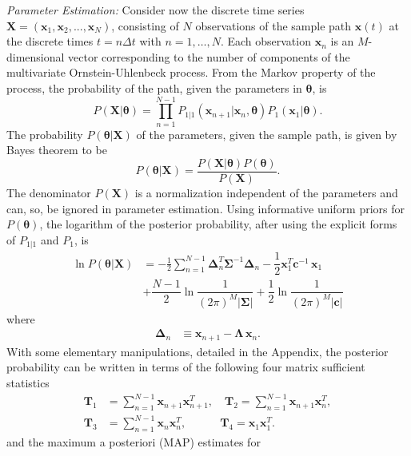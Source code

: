 \documentclass[english,aps, twocolumn, pre,superscriptaddress, notitlepage]{revtex4-1}
\begin{document}
\emph{Parameter Estimation: }Consider now the discrete time series
$\boldsymbol{X}=\left(\boldsymbol{x}_{1},\boldsymbol{x}_{2},...,\boldsymbol{x}_{N}\right)$,
consisting of $N$ observations of the sample path $\boldsymbol{x}(t)$
at the discrete times $t=n\Delta t$ with $n=1,\ldots,N.$ Each observation
$\boldsymbol{x}_{n}$ is an $M$-dimensional vector corresponding
to the number of components of the multivariate Ornstein-Uhlenbeck
process. From the Markov property of the process, the probability
of the path, given the parameters in $\boldsymbol{\theta}$, is
\begin{equation}
P\left(\boldsymbol{X}\vert\boldsymbol{\theta}\right)=\prod_{n=1}^{N-1}P_{1\vert1}\left(\boldsymbol{x}_{n+1}\vert\boldsymbol{x}_{n},\boldsymbol{\theta}\right)P_{1}\left(\boldsymbol{x}_{1}\vert\boldsymbol{\theta}\right).
\end{equation}
The probability $P\left(\boldsymbol{\theta}\vert\boldsymbol{X}\right)$
of the parameters, given the sample path, is given by Bayes theorem
to be
\begin{equation}
P\left(\boldsymbol{\theta}\vert\boldsymbol{X}\right)=\dfrac{P\left(\bm{X}\vert\boldsymbol{\theta}\right)P\left(\boldsymbol{\theta}\right)}{P\left(\boldsymbol{X}\right)}.\label{eq:bayes-theorem}
\end{equation}
The denominator $P\left(\bm{X}\right)$ is a normalization independent
of the parameters and can, so, be ignored in parameter estimation.
Using informative uniform priors for $P\left(\boldsymbol{\theta}\right)$,
the logarithm of the posterior probability, after using the explicit
forms of $P_{1\vert1}$ and $P_{1}$, is
\begin{align*}
\ln P\left(\boldsymbol{\theta}\vert\bm{X}\right) & =-\frac{1}{2}\sum_{n=1}^{N-1}\boldsymbol{\Delta}_{n}^{T}\boldsymbol{\Sigma}^{-1}\boldsymbol{\Delta}_{n}-\dfrac{1}{2}\boldsymbol{x}_{1}^{T}\boldsymbol{c}^{-1}\,\boldsymbol{x}_{1}\\
 & +\dfrac{N-1}{2}\ln\dfrac{1}{\left(2\pi\right)^{M}\vert\bm{\Sigma}\vert}+\dfrac{1}{2}\ln\dfrac{1}{\left(2\pi\right)^{M}|\bm{c}|}
\end{align*}
where 
\begin{align}
\boldsymbol{\Delta}_{n} & \equiv\boldsymbol{x}_{n+1}-\boldsymbol{\Lambda}\,\boldsymbol{x}_{n}.\label{eq:posteriorBayesI}
\end{align}
With some elementary manipulations, detailed in the Appendix, the
posterior probability can be written in terms of the following four
matrix sufficient statistics \begin{subequations}\label{eq:sufficientStatistics}
\begin{flalign}
\boldsymbol{T}_{1} & =\sum_{n=1}^{N-1}\boldsymbol{x}_{n+1}\boldsymbol{x}_{n+1}^{T},\quad\boldsymbol{T}_{2}=\sum_{n=1}^{N-1}\boldsymbol{x}_{n+1}\boldsymbol{x}_{n}^{T},\\
\boldsymbol{T}_{3} & =\sum_{n=1}^{N-1}\boldsymbol{x}_{n}\boldsymbol{x}_{n}^{T},\quad\quad\quad\boldsymbol{T}_{4}=\boldsymbol{x}_{1}\boldsymbol{x}_{1}^{T}.
\end{flalign}
\end{subequations}and the maximum a posteriori (MAP) estimates for
\end{document}

